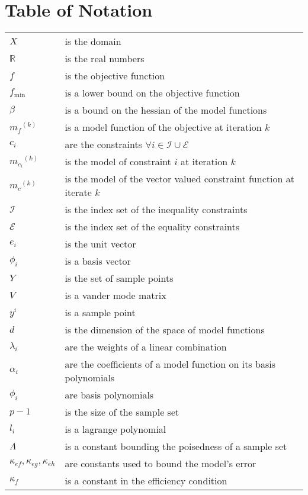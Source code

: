 \documentclass{article}
\theoremstyle{case}
\newcommand{\domain}{X}
\newcommand{\real}{\mathbb R}
\newcommand{\modelk}{{{m}_f}^{(k)}}
\newcommand{\modelconstrainti}{{{m}_{c_i}}^{(k)}}
\newcommand{\modelconstraint}{{{m}_{c}}^{(k)}}
\begin{document}
\section{Table of Notation}
\begin{longtable}{| p{} | p{} |}
$\domain$ & is the domain \\
$\real$ & is the real numbers \\
$f$ & is the objective function \\
$f_{\text{min}}$ & is a lower bound on the objective function \\
$\beta$ & is a bound on the hessian of the model functions \\
$\modelk$ & is a model function of the objective at iteration $k$ \\
$c_i$ & are the constraints $\forall i \in \mathcal{I} \cup \mathcal{E} $ \\
$\modelconstrainti$ & is the model of constraint $i$ at iteration $k$ \\
$\modelconstraint$ & is the model of the vector valued constraint function at iterate $k$ \\
$\mathcal{I}$ & is the index set of the inequality constraints \\
$\mathcal{E}$ & is the index set of the equality constraints \\
$e_i$ & is the unit vector \\
$\phi_i$ & is a basis vector \\
$Y$ & is the set of sample points \\
$V$ & is a vander mode matrix \\
$y^i$ & is a sample point \\
$d$ & is the dimension of the space of model functions \\
$\lambda_i$ & are the weights of a linear combination \\
$\alpha_i$ & are the coefficients of a model function on its basis polynomials \\
$\phi_i$ & are basis polynomials \\
$p-1$ & is the size of the sample set \\
$l_i$ & is a lagrange polynomial \\
$\Lambda$ & is a constant bounding the poisedness of a sample set \\
$\kappa_{ef},\kappa_{eg},\kappa_{eh}$ & are constants used to bound the model's error \\
$\kappa_{f}$ & is a constant in the efficiency condition \\

\end{longtable}
\end{document}
